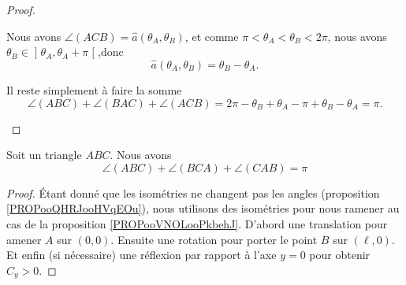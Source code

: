 \begin{proof}
\begin{subproof}
			Nous avons \( \angle(ACB)=\hat a(\theta_A,\theta_B)\), et comme \( \pi<\theta_A<\theta_B<2\pi\), nous avons \( \theta_B\in\mathopen] \theta_A,\theta_A+\pi\mathclose[\),donc
		\begin{equation}
			\hat a(\theta_A,\theta_B)=\theta_B-\theta_A.
		\end{equation}

		\spitem[Et la somme]
		Il reste simplement à faire la somme
		\begin{equation}
			\angle(ABC)+\angle(BAC)+\angle(ACB)  =2\pi-\theta_B+\theta_A-\pi+\theta_B-\theta_A =\pi.
		\end{equation}
	\end{subproof}
\end{proof}

\begin{theorem}	\label{THOooSHGGooDaTAwK}
	Soit un triangle \( ABC\). Nous avons
	\begin{equation}
		\angle(ABC)+\angle(BCA)+\angle(CAB)=\pi
	\end{equation}
\end{theorem}

\begin{proof}
	Étant donné que les isométries ne changent pas les angles (proposition \ref{PROPooQHRJooHVqEOu}), nous utilisons des isométries pour nous ramener au cas de la proposition \ref{PROPooVNOLooPkbehJ}. D'abord une translation pour amener \( A\) sur \( (0,0)\). Ensuite une rotation pour porter le point \( B\) sur \( (\ell, 0)\). Et enfin (si nécessaire) une réflexion par rapport à l'axe \( y=0\) pour obtenir \( C_y>0\).
\end{proof}
